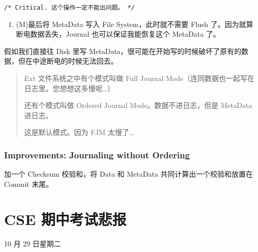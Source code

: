 \documentclass[
]{article}
\begin{document}
\texttt{/*\ Critical.\ 这个操作一定不能出问题。\ */}

\begin{enumerate}
\def\labelenumi{\arabic{enumi}.}
\item
  (M)最后将 MetaData 写入 File System，此时就不需要 Flush
  了。因为就算断电数据丢失，Journal 也可以保证我能恢复这个 MetaData 了。
\end{enumerate}

假如我们直接往 Disk 里写
MetaData，很可能在开始写的时候破坏了原有的数据，但在中途断电的时候无法回去。

\begin{quote}
Ext 文件系统之中有个模式叫做 Full Journal
Mode（连同数据也一起写在日志里。您想想这多慢呢\ldots）

还有个模式叫做 Ordered Journal Mode。数据不进日志，但是 MetaData
进日志。

这是默认模式。因为 FJM 太慢了\ldots{}
\end{quote}

\hypertarget{header-n221}{%
\subsubsection{Improvements: Journaling without
Ordering}\label{header-n221}}

加一个 Checksum 校验和，将 Data 和 MetaData 共同计算出一个校验和放置在
Commit 末尾。

\hypertarget{header-n223}{%
\section{CSE 期中考试悲报}\label{header-n223}}

10 月 29 日星期二
\end{document}
